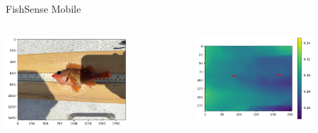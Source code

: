 \begin{frame}{FishSense Mobile}
     \begin{columns}
         \begin{column}{0.5\textwidth}
             \centering
             \includegraphics[height=0.7\textheight,width=0.7\textwidth,keepaspectratio]{images/fs_rgb_2.png}
         \end{column}
         \begin{column}{0.5\textwidth}
             \centering
             \includegraphics[height=0.7\textheight,width=0.7\textwidth,keepaspectratio]{images/fs_depth_2.png}
         \end{column}
     \end{columns}
\end{frame}

